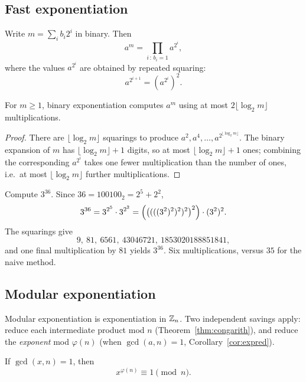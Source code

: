 \documentclass[11pt]{article}
\begin{document}
\subsection{Fast exponentiation}
\label{sec:fastexp}

\begin{definition}
Write $m=\sum_{i}b_i2^i$ in binary. Then
\[
a^m=\prod_{i \,:\, b_i=1}a^{2^i},
\]
where the values $a^{2^i}$ are obtained by repeated squaring:
\[
a^{2^{i+1}}=\left(a^{2^i}\right)^2.
\]
\end{definition}

\begin{theorem}[Cost]
\label{thm:fastexpcost}
For $m\ge1$, binary exponentiation computes $a^m$ using at most $2\lfloor\log_2 m\rfloor$ multiplications.
\end{theorem}

\begin{proof}
There are $\lfloor\log_2m\rfloor$ squarings to produce $a^2,a^4,\dots,a^{2^{\lfloor\log_2m\rfloor}}$. The binary expansion of $m$ has $\lfloor\log_2m\rfloor+1$ digits, so at most $\lfloor\log_2m\rfloor+1$ ones; combining the corresponding $a^{2^i}$ takes one fewer multiplication than the number of ones, i.e.\ at most $\lfloor\log_2m\rfloor$ further multiplications.
\end{proof}

\begin{example}
Compute $3^{36}$. Since $36=100100_2=2^5+2^2$,
\[
3^{36}=3^{2^5}\cdot3^{2^2}=\Bigl(\bigl((((3^2)^2)^2)^2\bigr)^2\Bigr)\cdot(3^2)^2.
\]
The squarings give
\[
9,\ 81,\ 6561,\ 43046721,\ 1853020188851841,
\]
and one final multiplication by $81$ yields $3^{36}$. Six multiplications, versus $35$ for the naive method.
\end{example}

\subsection{Modular exponentiation}
\label{sec:modexp}

\begin{note}
Modular exponentiation is exponentiation in $\mathbb{Z}_n$. Two independent savings apply: reduce each intermediate product mod $n$ (Theorem~\ref{thm:congarith}), and reduce the \emph{exponent} mod $\varphi(n)$ (when $\gcd(a,n)=1$, Corollary~\ref{cor:expred}).
\end{note}

\begin{theorem}[Euler]
\label{thm:euler}
If $\gcd(x,n)=1$, then
\[
x^{\varphi(n)}\equiv1\pmod n.
\]
\end{theorem}
\end{document}
